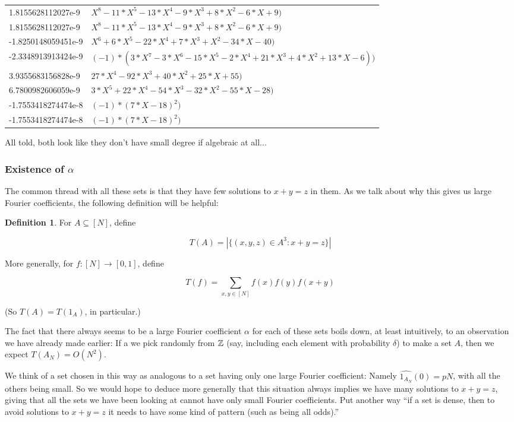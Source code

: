 \documentclass{article}
\theoremstyle{definition}
\newtheorem{definition}{Definition}
\theoremstyle{remark}
\numberwithin{equation}{section}
\begin{document}
{\begin{tabular}{ll}
 1.8155628112027e-9 & $X^8 - 11*X^5 - 13*X^4 - 9*X^3 + 8*X^2 - 6*X + 9)$\\
 1.8155628112027e-9 & $X^8 - 11*X^5 - 13*X^4 - 9*X^3 + 8*X^2 - 6*X + 9)$\\
-1.8250148059451e-9 & $X^6 + 6*X^5 - 22*X^4 + 7*X^3 + X^2 - 34*X - 40)$\\
-2.3348913913424e-9 & $(-1) * (3*X^7 - 3*X^6 - 15*X^5 - 2*X^4 + 21*X^3 + 4*X^2 + 13*X - 6))$\\
 3.9355683156828e-9 & $27*X^4 - 92*X^3 + 40*X^2 + 25*X + 55)$\\
 6.7800982606059e-9 & $3*X^5 + 22*X^4 - 54*X^3 - 32*X^2 - 55*X - 28)$\\
-1.7553418274474e-8 & $(-1) * (7*X - 18)^2)$\\
-1.7553418274474e-8 & $(-1) * (7*X - 18)^2)$
\end{tabular}

All told, both look like they don't have small degree if algebraic at all...
}

\subsubsection{Existence of $\alpha$}

The common thread with all these sets is that they have few solutions
to $x+y=z$ in them.  As we talk about why this gives us large Fourier
coefficients, the following definition will be helpful: 

\begin{definition}
  For $A \subseteq [N]$, define
  
  \[T(A) = \left|\{(x,y,z) \in A^3 : x+y=z\}\right|\]

  More generally, for $f : [N] \to [0,1]$, define

  \[T(f) = \sum_{x,y \in [N]} f(x)f(y)f(x+y)\]

  (So $T(A) = T(1_A)$, in particular.)
\end{definition}

The fact that there always seems to be a large Fourier coefficient
$\alpha$ for each of these sets boils down, at least intuitively, to
an observation we have already made earlier: If a we pick randomly
from $\mathbb{Z}$ (say, including each element with probability $\delta$) to
make a set $A$, then we expect $T(A_N) = O(N^2)$.  

We think of a set chosen in this way as analogous to a set having only
one large Fourier coefficient: Namely $\widehat{1_{A_N}}(0) = pN$,
with all the others being small.  So we would hope to deduce more
generally that this situation always implies we have many solutions to
$x+y=z$, giving that all the sets we have been looking at cannot have
only small Fourier coefficients.  Put another way ``if a set is dense,
then to avoid solutions to $x+y=z$ it needs to have some kind of
pattern (such as being all odds).''
\end{document}
